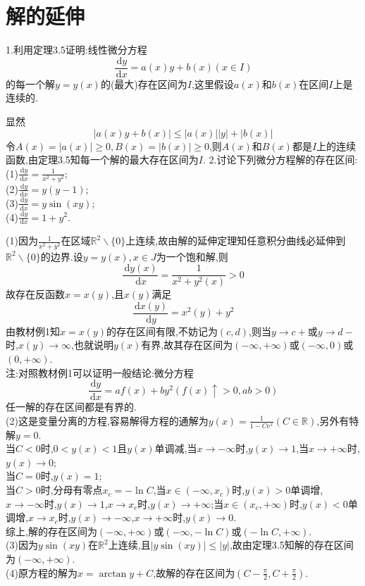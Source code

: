 \documentclass[titlepage,11pt,a4paper,twoside]{report}
\makeatletter
\newcommand\diff{\,\mathrm{d}}
\newcommand\e{\mathrm{e}}
\renewenvironment{proof}{\par
	\pushQED{\qed}%
	\normalfont \topsep1\p@\@plus6\p@\relax
	\trivlist
	\item\relax
	{\hspace*{\parindent}{\heiti 证明}\@addpunct{:}}\hspace\labelsep\ignorespaces
}{%
	\popQED\endtrivlist\@endpefalse
}
\newenvironment{solve}{\par
	\pushQED{\qed}%
	\normalfont \topsep1\p@\@plus6\p@\relax
	\trivlist
	\item\relax
	{\hspace*{\parindent}{\heiti 解}\@addpunct{:}}\hspace\labelsep\ignorespaces
}{%
	\popQED\endtrivlist\@endpefalse
}
\makeatother
\begin{document}
\section{解的延伸}
1.利用定理3.5证明:线性微分方程
\[\frac{\diff y}{\diff x}=a(x)y+b(x)(x\in I)\]
的每一个解$y=y(x)$的(最大)存在区间为$I$,这里假设$a(x)$和$b(x)$在区间$I$上是连续的.
\begin{proof}显然
\[|a(x)y+b(x)|\leq|a(x)||y|+|b(x)|\]
令$A(x)=|a(x)|\geq0,B(x)=|b(x)|\geq0$,则$A(x)$和$B(x)$都是$I$上的连续函数,由定理3.5知每一个解的最大存在区间为$I$.
\end{proof}
2.讨论下列微分方程解的存在区间:\\
(1)$\displaystyle\frac{\diff y}{\diff x}=\frac{1}{x^2+y^2}$;\\
(2)$\displaystyle\frac{\diff y}{\diff x}=y(y-1)$;\\
(3)$\displaystyle\frac{\diff y}{\diff x}=y\sin(xy)$;\\
(4)$\displaystyle\frac{\diff y}{\diff x}=1+y^2$.
\begin{solve}
(1)因为$\frac{1}{x^2+y^2}$在区域$\mathbb{R}^2\backslash\{0\}$上连续,故由解的延伸定理知任意积分曲线必延伸到$\mathbb{R}^2\backslash\{0\}$的边界.设$y=y(x),x\in J$为一个饱和解,则
\[\frac{\diff y(x)}{\diff x}=\frac{1}{x^2+y^2(x)}>0\]
故存在反函数$x=x(y)$,且$x(y)$满足
\[\frac{\diff x(y)}{\diff y}=x^2(y)+y^2\]
由教材例1知$x=x(y)$的存在区间有限,不妨记为$(c,d)$,则当$y\to c+$或$y\to d-$时,$x(y)\to\infty$,也就说明$y(x)$有界,故其存在区间为$(-\infty,+\infty)$或$(-\infty,0)$或$(0,+\infty)$.\\
注:对照教材例1可以证明一般结论:微分方程
\[\frac{\diff y}{\diff x}=af(x)+by^2(f(x)\uparrow>0,ab>0)\]
任一解的存在区间都是有界的.\\
(2)这是变量分离的方程,容易解得方程的通解为$\displaystyle y(x)=\frac{1}{1-C\e^x}(C\in\mathbb{R})$,另外有特解$y=0$.\\
当$C<0$时,$0<y(x)<1$且$y(x)$单调减,当$x\to-\infty$时,$y(x)\to1$,当$x\to+\infty$时,$y(x)\to0$;\\
当$C=0$时,$y(x)=1$;\\
当$C>0$时,分母有零点$x_c=-\ln C$,当$x\in(-\infty,x_c)$时,$y(x)>0$单调增,$x\to-\infty$时,$y(x)\to1$,$x\to x_c$时,$y(x)\to+\infty$;当$x\in(x_c,+\infty)$时,$y(x)<0$单调增,$x\to x_c$时,$y(x)\to-\infty$,$x\to+\infty$时,$y(x)\to0$.\\
综上,解的存在区间为$(-\infty,+\infty)$或$(-\infty,-\ln C)$或$(-\ln C,+\infty)$.\\
(3)因为$y\sin(xy)$在$\mathbb{R}^2$上连续,且$|y\sin(xy)|\leq|y|$,故由定理3.5知解的存在区间为$(-\infty,+\infty)$.\\
(4)原方程的解为$x=\arctan y+C$,故解的存在区间为$(C-\frac{\pi}{2},C+\frac{\pi}{2})$.
\end{solve}
\end{document}
